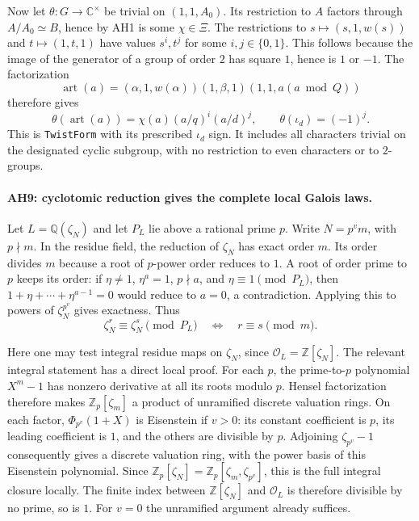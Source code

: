 Now let $\theta:G\to\mathbb C^\times$ be trivial on $(1,1,A_0)$.
Its restriction to $A$ factors through $A/A_0\simeq B$, hence by AH1 is
some $\chi\in\Xi$. The restrictions to
$s\mapsto(s,1,w(s))$ and $t\mapsto(1,t,1)$ have values $s^i,t^j$
for some $i,j\in\{0,1\}$. This follows because the image of the generator
of a group of order $2$ has square $1$, hence is $1$ or $-1$.
The factorization
\[
 \operatorname{art}(a)
  =(\alpha,1,w(\alpha))(1,\beta,1)(1,1,a(a\bmod Q))
\]
therefore gives
\[
 \theta(\operatorname{art}(a))
   =\chi(a)(a/q)^i(a/d)^j,\qquad
 \theta(\iota_d)=(-1)^j.                        \tag{AH.18}
\]
This is \texttt{TwistForm} with its prescribed $\iota_d$ sign. It includes
all characters trivial on the designated cyclic subgroup, with no
restriction to even characters or to $2$-groups.

\paragraph{AH9: cyclotomic reduction gives the complete local Galois laws.}
Let $L=\mathbb Q(\zeta_N)$ and let $P_L$ lie above a rational prime $p$.
Write $N=p^v m$, with $p\nmid m$. In the residue field, the reduction of
$\zeta_N$ has exact order $m$. Its order divides $m$ because a root of
$p$-power order reduces to $1$. A root of order prime to $p$ keeps its
order: if $\eta\ne1$, $\eta^a=1$, $p\nmid a$, and $\eta\equiv1\pmod{P_L}$,
then $1+\eta+\cdots+\eta^{a-1}=0$ would reduce to $a=0$, a contradiction.
Applying this to powers of $\zeta_N^{p^v}$ gives exactness. Thus
\[
 \zeta_N^r\equiv\zeta_N^s\pmod{P_L}
       \quad\Longleftrightarrow\quad r\equiv s\pmod m.          \tag{AH.19}
\]

Here one may test integral residue maps on $\zeta_N$, since
$\mathcal O_L=\mathbb Z[\zeta_N]$. The relevant integral statement has
a direct local proof. For each $p$, the prime-to-$p$ polynomial
$X^m-1$ has nonzero derivative at all its roots modulo $p$.
Hensel factorization therefore makes $\mathbb Z_p[\zeta_m]$ a product
of unramified discrete valuation rings. On each factor,
$\Phi_{p^v}(1+X)$ is Eisenstein if $v>0$: its constant coefficient is
$p$, its leading coefficient is $1$, and the others are divisible by $p$.
Adjoining $\zeta_{p^v}-1$ consequently gives a discrete valuation ring,
with the power basis of this Eisenstein polynomial. Since
$\mathbb Z_p[\zeta_N]=\mathbb Z_p[\zeta_m,\zeta_{p^v}]$, this is the
full integral closure locally. The finite index between
$\mathbb Z[\zeta_N]$ and $\mathcal O_L$ is therefore divisible by no prime,
so is $1$. For $v=0$ the unramified argument already suffices.

